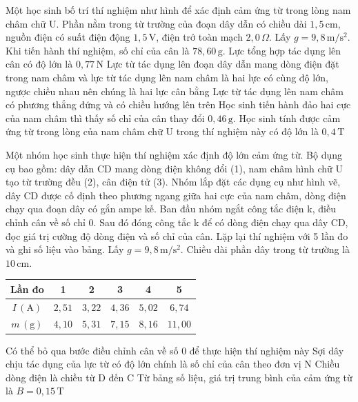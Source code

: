 \documentclass[12pt,a4paper]{article}
\begin{document}
\begin{ex}
	Một học sinh bố trí thí nghiệm như hình để xác định cảm ứng từ trong lòng nam châm chữ U. Phần nằm trong từ trường của đoạn dây dẫn có chiều dài $1{,}5 \, \mathrm{cm}$, nguồn điện có suất điện động $1{,}5 \, \mathrm{V}$, điện trở toàn mạch $2{,}0 \, \Omega$. Lấy $g = 9{,}8 \, \mathrm{m/s^2}$. Khi tiến hành thí nghiệm, số chỉ của cân là $78{,}60 \, \mathrm{g}$.
	\choiceTF
	{Lực tổng hợp tác dụng lên cân có độ lớn là $0{,}77 \, \mathrm{N}$}
	{Lực từ tác dụng lên đoạn dây dẫn mang dòng điện đặt trong nam châm và lực từ tác dụng lên nam châm là hai lực có cùng độ lớn, ngược chiều nhau nên chúng là hai lực cân bằng}
	{Lực từ tác dụng lên nam châm có phương thẳng đứng và có chiều hướng lên trên}
	{Học sinh tiến hành đảo hai cực của nam châm thì thấy số chỉ của cân thay đổi $0{,}46 \, \mathrm{g}$. Học sinh tính được cảm ứng từ trong lòng của nam châm chữ U trong thí nghiệm này có độ lớn là $0{,}4 \, \mathrm{T}$}
\end{ex}

\begin{ex}
	Một nhóm học sinh thực hiện thí nghiệm xác định độ lớn cảm ứng từ. Bộ dụng cụ bao gồm: dây dẫn CD mang dòng điện không đổi (1), nam châm hình chữ U tạo từ trường đều (2), cân điện tử (3). Nhóm lắp đặt các dụng cụ như hình vẽ, dây CD được cố định theo phương ngang giữa hai cực của nam châm, dòng điện chạy qua đoạn dây có gắn ampe kế. Ban đầu nhóm ngắt công tắc điện k, điều chỉnh cân về số chỉ 0. Sau đó đóng công tắc k để có dòng điện chạy qua dây CD, đọc giá trị cường độ dòng điện và số chỉ của cân. Lặp lại thí nghiệm với 5 lần đo và ghi số liệu vào bảng. Lấy $g = 9{,}8 \, \mathrm{m/s^2}$. Chiều dài phần dây trong từ trường là $10 \, \mathrm{cm}$.
	\begin{center}
		\begin{tabular}{|c|c|c|c|c|c|}
			\hline
			Lần đo & 1 & 2 & 3 & 4 & 5 \\
			\hline
			$I \, (\mathrm{A})$ & $2{,}51$ & $3{,}22$ & $4{,}36$ & $5{,}02$ & $6{,}74$ \\
			\hline
			$m \, (\mathrm{g})$ & $4{,}10$ & $5{,}31$ & $7{,}15$ & $8{,}16$ & $11{,}00$ \\
			\hline
		\end{tabular}
	\end{center}
	\choiceTF
	{Có thể bỏ qua bước điều chỉnh cân về số 0 để thực hiện thí nghiệm này}
	{Sợi dây chịu tác dụng của lực từ có độ lớn chính là số chỉ của cân theo đơn vị N}
	{Chiều dòng điện là chiều từ D đến C}
	{Từ bảng số liệu, giá trị trung bình của cảm ứng từ là $B = 0{,}15 \, \mathrm{T}$}
\end{ex}
\end{document}
